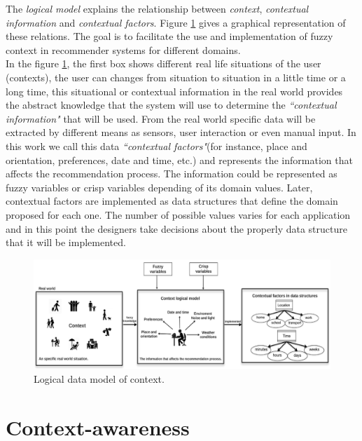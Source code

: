 The \textit{logical model} explains the relationship between \textit{context},
\textit{contextual information} and \textit{contextual factors}. 
Figure \ref{fig:logicalmodel} gives a graphical representation of these relations. 
The goal is to facilitate the use and implementation of fuzzy context 
in recommender systems for different domains.\\
In the figure \ref{fig:logicalmodel}, the first box shows different
real life situations of the user (contexts), the user can changes from situation
to situation in a little time or a long time, this situational or
contextual information in the real world provides the abstract knowledge that
the system will use to determine the \textit{``contextual information"} that will 
be used. 
From the real world specific data will be extracted by different means as
sensors, user interaction or even manual input. In this work 
we call this data \textit{``contextual factors"}(for instance, place and
orientation, preferences, date and time, etc.) and represents the
information that affects the recommendation process. The information
could be represented as fuzzy variables or crisp variables depending of
its domain values. Later, contextual factors are implemented as data
structures that define the domain proposed for each one. The number of
possible values varies for each application and  in this point 
the designers take decisions about the properly data structure  
that it will be implemented.
\begin{figure}
\captionsetup{font=footnotesize} \centering
\includegraphics[width=1.0\textwidth]{img/context-scheme.png}  
\small
\caption{Logical data model of context.}
\label{fig:logicalmodel}    
\end{figure} %

\section{Context-awareness} \label{context-awareness}

